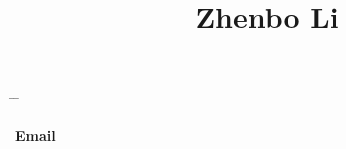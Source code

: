 

\title{Zhenbo Li} %

\vspace{-0.5cm}
\parbox[c][3em][t]{0.9\textwidth}{ %
	\begin{tabbing} %
		\hspace{3cm} \= \hspace{4cm} \= \kill %
		
{\bf Email} \> 
		
	\end{tabbing}
}

\vspace{-5mm}